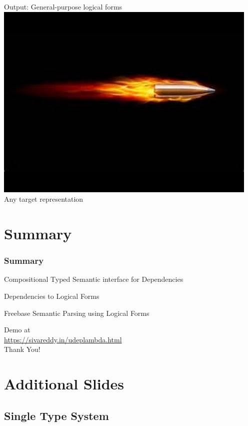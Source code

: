 \documentclass[mathserif,12pt]{beamer}
\newcommand{\hlight}[1]{{\color{blue!80} #1}}
\begin{document}
\begin{frame}
\pause
\vspace{2em}
Output: General-purpose logical forms\\
\pause \includegraphics[trim=16em 14em 4em 10em,clip=true,scale=0.2]{figures/bullet}\; Any target representation
\end{frame}

\section{Summary}
\begin{frame}
\frametitle{Summary}
\large


Compositional Typed Semantic interface for Dependencies
 
\vspace{2em} 
Dependencies to Logical Forms

 \vspace{2em}
Freebase Semantic Parsing using Logical Forms

\vspace{2em}
\begin{center}Demo at\\ \hlight{\url{https://sivareddy.in/udeplambda.html}} \\
  Thank You!
\end{center}
\end{frame}


\section{Additional Slides}


\subsection{Single Type System}
\end{document}
